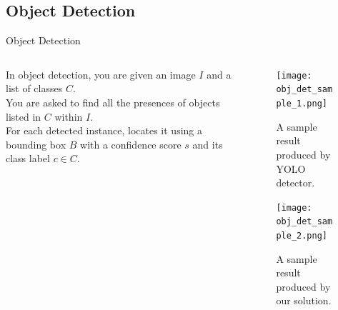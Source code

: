 \documentclass{beamer}
\begin{document}
\subsection{Object Detection}
\begin{frame}{Object Detection}
    \begin{columns}
       	\begin{column}{0.5\textwidth}
       		In object detection, you are given an image $I$ and a list 
       		of classes $C$. \\
            You are asked to find all the presences of 
       		objects listed in $C$ within $I$. \\
            For each detected instance,
       		locates it using a bounding box $B$ with a confidence score $s$
            and its class label $c \in C$.
       	\end{column}
       	\begin{column}{0.4\textwidth}
            \begin{figure}
                \texttt{[image: obj\_det\_sample\_1.png]}
                \caption{A sample result produced by YOLO detector.}
               	\texttt{[image: obj\_det\_sample\_2.png]}
                \caption{A sample result produced by our solution.}
            \end{figure}
       	\end{column}
    \end{columns}

\end{frame}
\end{document}
